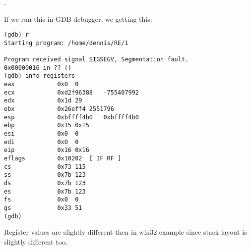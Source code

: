  .

{If we run this in GDB debugger, we getting this:}

\begin{lstlisting}
(gdb) r
Starting program: /home/dennis/RE/1 

Program received signal SIGSEGV, Segmentation fault.
0x00000016 in ?? ()
(gdb) info registers
eax            0x0	0
ecx            0xd2f96388	-755407992
edx            0x1d	29
ebx            0x26eff4	2551796
esp            0xbffff4b0	0xbffff4b0
ebp            0x15	0x15
esi            0x0	0
edi            0x0	0
eip            0x16	0x16
eflags         0x10202	[ IF RF ]
cs             0x73	115
ss             0x7b	123
ds             0x7b	123
es             0x7b	123
fs             0x0	0
gs             0x33	51
(gdb) 
\end{lstlisting}

{Register values are slightly different then in win32 example
since stack layout is slightly different too.}
